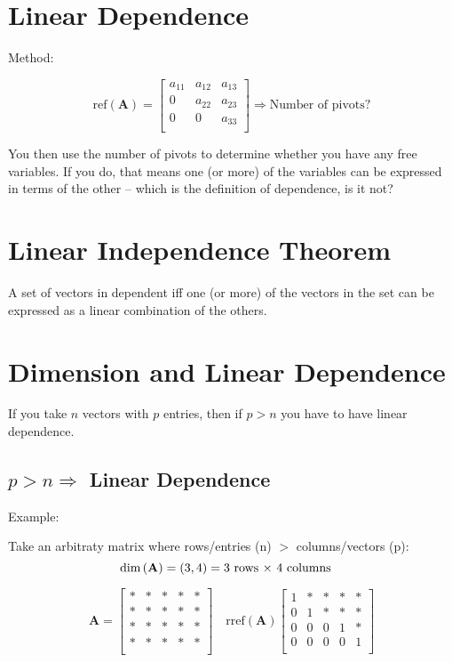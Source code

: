 \documentclass{article}
\author{Alex Hiller}
\title{}
\begin{document}
\section{Linear Dependence} 
Method:

\[%
    \text{ref} \left(\mathbf{A}\right) = 
    \begin{bmatrix}
        a_{11} & a_{12} & a_{13} \\
		0 & a_{22} & a_{23} \\
		0 & 0 & a_{33} \\		
    \end{bmatrix}
    \Rightarrow 
    \text{Number of pivots?}
\]%

You then use the number of pivots to determine whether you have any free
variables. If you do, that means one (or more) of the variables can be expressed
in terms of the other --  which is the definition of dependence, is it not?

\section{Linear Independence Theorem} 
A set of vectors in dependent iff one (or more) of the vectors in the set can be
expressed as a linear combination of the others.


\section{Dimension and Linear Dependence} 
If you take $ n $  vectors with $ p $  entries, then if $ p > n $  you have to
have linear dependence.


\subsection{$ p>n \Rightarrow $ Linear Dependence} 

Example:

Take an arbitraty matrix where rows/entries (n) $ > $ columns/vectors (p):
\[%
    \text{dim} \left(\mathbf{A}\right) = (3,4) = \text{3 rows $ \times $ 4 columns} 
    \quad
\]%


\[%
    \mathbf{A} = 
    \begin{bmatrix}
        * & * & * & * & * \\
        * & * & * & * & * \\
        * & * & * & * & * \\
        * & * & * & * & * \\
    \end{bmatrix}
    \quad
    \text{rref} (\mathbf{A}) 
    \begin{bmatrix}
        1 & * & * & * & * \\
        0 & 1 & * & * & * \\
        0 & 0 & 0 & 1 & * \\
        0 & 0 & 0 & 0 & 1 \\
    \end{bmatrix}
\]%
\end{document}
